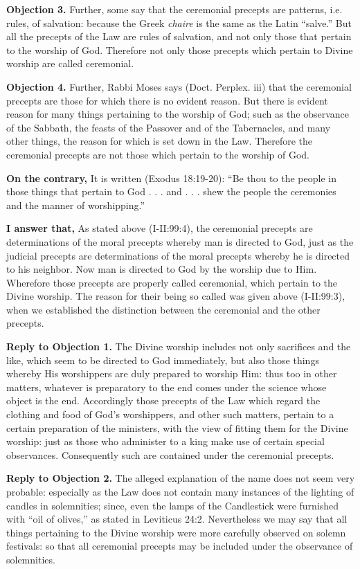 \textbf{Objection 3.} Further, some say that the ceremonial precepts are patterns, i.e. rules, of salvation: because the Greek \emph{chaire} is the same as the Latin ``salve.'' But all the precepts of the Law are rules of salvation, and not only those that pertain to the worship of God. Therefore not only those precepts which pertain to Divine worship are called ceremonial.

\textbf{Objection 4.} Further, Rabbi Moses says (Doct. Perplex. iii) that the ceremonial precepts are those for which there is no evident reason. But there is evident reason for many things pertaining to the worship of God; such as the observance of the Sabbath, the feasts of the Passover and of the Tabernacles, and many other things, the reason for which is set down in the Law. Therefore the ceremonial precepts are not those which pertain to the worship of God.

\textbf{On the contrary,} It is written (Exodus 18:19-20): ``Be thou to the people in those things that pertain to God . . . and . . . shew the people the ceremonies and the manner of worshipping.''

\textbf{I answer that,} As stated above (I-II:99:4), the ceremonial precepts are determinations of the moral precepts whereby man is directed to God, just as the judicial precepts are determinations of the moral precepts whereby he is directed to his neighbor. Now man is directed to God by the worship due to Him. Wherefore those precepts are properly called ceremonial, which pertain to the Divine worship. The reason for their being so called was given above (I-II:99:3), when we established the distinction between the ceremonial and the other precepts.

\textbf{Reply to Objection 1.} The Divine worship includes not only sacrifices and the like, which seem to be directed to God immediately, but also those things whereby His worshippers are duly prepared to worship Him: thus too in other matters, whatever is preparatory to the end comes under the science whose object is the end. Accordingly those precepts of the Law which regard the clothing and food of God's worshippers, and other such matters, pertain to a certain preparation of the ministers, with the view of fitting them for the Divine worship: just as those who administer to a king make use of certain special observances. Consequently such are contained under the ceremonial precepts.

\textbf{Reply to Objection 2.} The alleged explanation of the name does not seem very probable: especially as the Law does not contain many instances of the lighting of candles in solemnities; since, even the lamps of the Candlestick were furnished with ``oil of olives,'' as stated in Leviticus 24:2. Nevertheless we may say that all things pertaining to the Divine worship were more carefully observed on solemn festivals: so that all ceremonial precepts may be included under the observance of solemnities.

